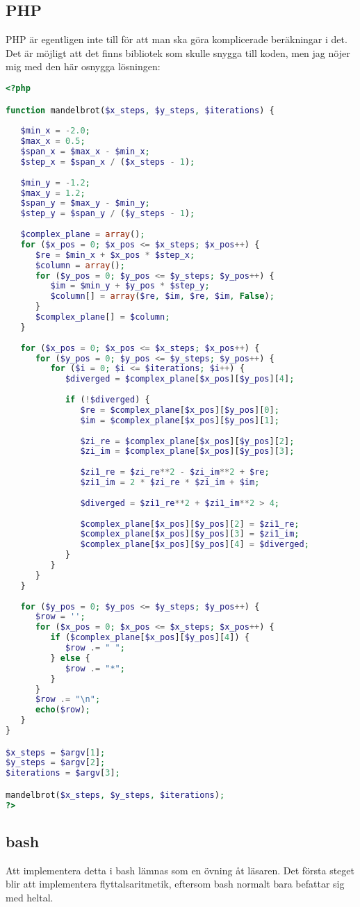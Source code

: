 \documentclass[10pt, twoside,a4paper]{article}
\begin{document}
\subsection{PHP}
PHP är egentligen inte till för att man ska göra komplicerade beräkningar i det. Det är möjligt att det finns bibliotek som skulle snygga till koden, men jag nöjer mig med den här osnygga lösningen:
\begin{lstlisting}[language=PHP]
<?php

function mandelbrot($x_steps, $y_steps, $iterations) {
   
   $min_x = -2.0;
   $max_x = 0.5;
   $span_x = $max_x - $min_x;
   $step_x = $span_x / ($x_steps - 1);
   
   $min_y = -1.2;
   $max_y = 1.2;
   $span_y = $max_y - $min_y;
   $step_y = $span_y / ($y_steps - 1);
   
   $complex_plane = array();
   for ($x_pos = 0; $x_pos <= $x_steps; $x_pos++) {
      $re = $min_x + $x_pos * $step_x;
      $column = array();
      for ($y_pos = 0; $y_pos <= $y_steps; $y_pos++) {
         $im = $min_y + $y_pos * $step_y;
         $column[] = array($re, $im, $re, $im, False);
      }
      $complex_plane[] = $column;
   }
   
   for ($x_pos = 0; $x_pos <= $x_steps; $x_pos++) {
      for ($y_pos = 0; $y_pos <= $y_steps; $y_pos++) {
         for ($i = 0; $i <= $iterations; $i++) { 
            $diverged = $complex_plane[$x_pos][$y_pos][4];
            
            if (!$diverged) {
               $re = $complex_plane[$x_pos][$y_pos][0];
               $im = $complex_plane[$x_pos][$y_pos][1];
               
               $zi_re = $complex_plane[$x_pos][$y_pos][2];
               $zi_im = $complex_plane[$x_pos][$y_pos][3];
               
               $zi1_re = $zi_re**2 - $zi_im**2 + $re;
               $zi1_im = 2 * $zi_re * $zi_im + $im;
               
               $diverged = $zi1_re**2 + $zi1_im**2 > 4;
               
               $complex_plane[$x_pos][$y_pos][2] = $zi1_re;
               $complex_plane[$x_pos][$y_pos][3] = $zi1_im;
               $complex_plane[$x_pos][$y_pos][4] = $diverged;
            }
         }
      }
   }
   
   for ($y_pos = 0; $y_pos <= $y_steps; $y_pos++) {
      $row = '';
      for ($x_pos = 0; $x_pos <= $x_steps; $x_pos++) {
         if ($complex_plane[$x_pos][$y_pos][4]) {
            $row .= " ";
         } else {
            $row .= "*";
         }
      }
      $row .= "\n";
      echo($row);
   }
}

$x_steps = $argv[1];
$y_steps = $argv[2];
$iterations = $argv[3];

mandelbrot($x_steps, $y_steps, $iterations);
?>
\end{lstlisting}


\newpage
\subsection{bash}
Att implementera detta i bash lämnas som en övning åt läsaren. Det första steget blir att implementera flyttalsaritmetik, eftersom bash normalt bara befattar sig med heltal.
\end{document}
